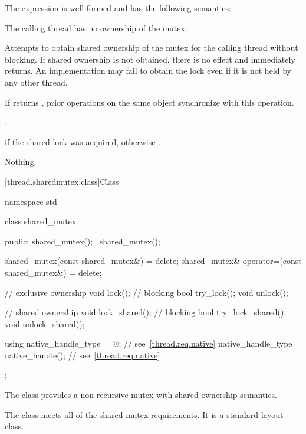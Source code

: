 \pnum
The expression  is well-formed and has the following semantics:

\begin{itemdescr}
\pnum
\expects
The calling thread has no ownership of the mutex.

\pnum
\effects
Attempts to obtain shared ownership of the mutex for the calling
thread without blocking. If shared ownership is not obtained, there is no
effect and  immediately returns. An implementation
may fail to obtain the lock even if it is not held by any other thread.

\pnum
\sync
If  returns , prior 
operations on the same object synchronize with this
operation.

\pnum
\returntype {}.

\pnum
\returns
{} if the shared lock was acquired, otherwise .

\pnum
\throws
Nothing.
\end{itemdescr}

[thread.sharedmutex.class]{Class }

%
\begin{codeblock}
namespace std {
  class shared_mutex {
  public:
    shared_mutex();
    ~shared_mutex();

    shared_mutex(const shared_mutex&) = delete;
    shared_mutex& operator=(const shared_mutex&) = delete;

    // exclusive ownership
    void lock();                // blocking
    bool try_lock();
    void unlock();

    // shared ownership
    void lock_shared();         // blocking
    bool try_lock_shared();
    void unlock_shared();

    using native_handle_type = @\impdefnc@;          // see~\ref{thread.req.native}
    native_handle_type native_handle();                         // see~\ref{thread.req.native}
  };
}
\end{codeblock}

\pnum
The class  provides a non-recursive mutex
with shared ownership semantics.

\pnum
The class  meets
all of the shared mutex requirements.
It is a standard-layout class.

